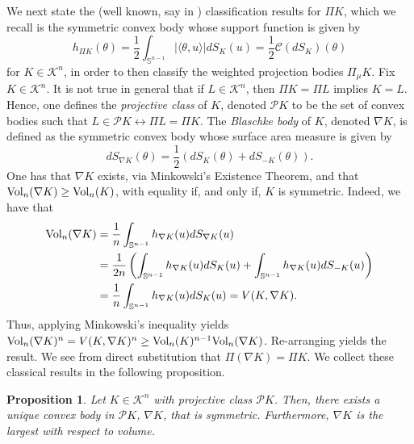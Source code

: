 \documentclass[11pt]{amsart}
\newtheorem{proposition}[theorem]{Proposition}
\theoremstyle{definition}
\theoremstyle{remark}
\numberwithin{equation}{section}
\newcommand{\s}{\mathbb{S}}
\newcommand{\conbod}{\mathcal{K}^n}
\newcommand{\vol}{\text{\rm Vol}}
\newcommand{\ct}[2]{\mathcal{C}({#1})({#2})}
\begin{document}
We next state the (well known, say in \cite{gardner_book}) classification results for $\Pi K$, which we recall is the symmetric convex body whose support function is given by
$$h_{\Pi K}(\theta)=\frac{1}{2}\int_{\s^{n-1}}|\langle \theta,u\rangle|dS_K(u)=\frac{1}{2}\ct{dS_K}\theta$$ for $K\in\conbod$,
in order to then classify the weighted projection bodies $\Pi_{\mu} K$. Fix $K\in\conbod$. It is not true in general that if $L\in\conbod$, then $\Pi K = \Pi L$ implies $K=L$. Hence, one defines the \textit{projective class} of $K$, denoted $\mathcal{P}K$ to be the set of convex bodies such that $L\in\mathcal{P}K\leftrightarrow \Pi L= \Pi K.$ The \textit{Blaschke body} of $K$, denoted $\nabla K$, is defined \cite{gardner_book, LE98, CMP67} as the symmetric convex body whose surface area measure is given by
$$dS_{\nabla K}(\theta)=\frac{1}{2}(dS_{K}(\theta) + dS_{-K}(\theta)).$$
One has that $\nabla K$ exists, via Minkowski's Existence Theorem, and that $\vol_n(\nabla K)\geq \vol_n(K)$, with equality if, and only if, $K$ is symmetric. Indeed, we have that
\begin{align*}
\vol_n(\nabla K)&=\frac{1}{n}\int_{\s^{n-1}}h_{\nabla K}(u)dS_{\nabla K}(u)
\\
&=\frac{1}{2n}\left(\int_{\s^{n-1}}h_{\nabla K}(u)dS_{K}(u)+\int_{\s^{n-1}}h_{\nabla K}(u)dS_{-K}(u)\right)
\\
&=\frac{1}{n}\int_{\s^{n-1}}h_{\nabla K}(u)dS_{K}(u)=V(K,\nabla K).
\end{align*}
Thus, applying Minkowski's inequality yields
$\vol_n(\nabla K)^n=V(K,\nabla K)^n\geq \vol_n(K)^{n-1}\vol_n(\nabla K)$. Re-arranging yields the result.
We see from direct substitution that $\Pi(\nabla K)=\Pi K.$ We collect these classical results in the following proposition.
\begin{proposition}
\label{p:class}
Let $K\in\conbod$ with projective class $\mathcal{P}K$. Then, there exists a unique convex body in $\mathcal{P}K$, $\nabla K$, that is symmetric. Furthermore, $\nabla K$ is the largest with respect to volume.
\end{proposition}
\end{document}

